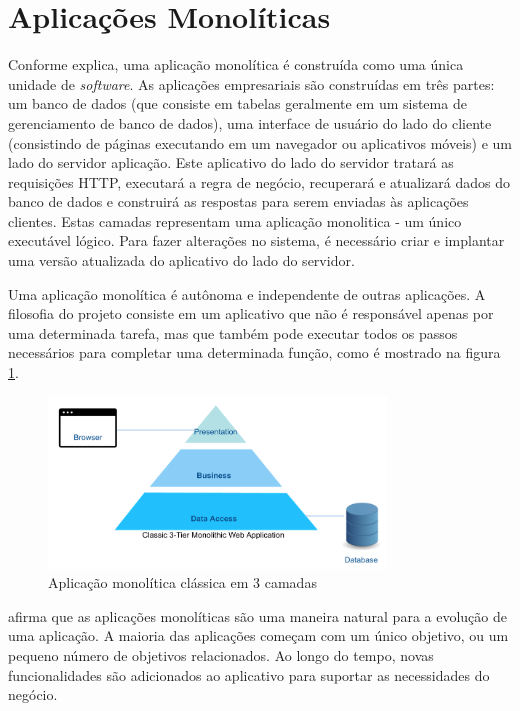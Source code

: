\section{Aplicações Monolíticas}\label{sec:monolitico}

Conforme  explica, uma aplicação monolítica é construída como uma única unidade de \textit{software}. As aplicações empresariais são construídas em três partes: um banco de dados (que consiste em tabelas geralmente em um sistema de gerenciamento de banco de dados), uma interface de usuário do lado do cliente (consistindo de páginas executando em um navegador ou aplicativos móveis) e um lado do servidor aplicação. Este aplicativo do lado do servidor tratará as requisições HTTP, executará a regra de negócio, recuperará e atualizará dados do banco de dados e construirá as respostas para serem enviadas às aplicações clientes. Estas camadas representam uma aplicação monolitica - um único executável lógico. Para fazer alterações no sistema, é necessário criar e implantar uma versão atualizada do aplicativo do lado do servidor.

Uma aplicação monolítica é autônoma e independente de outras aplicações. A filosofia do projeto consiste em um aplicativo que não é responsável apenas por uma determinada tarefa, mas que também pode executar todos os passos necessários para completar uma determinada função, como é mostrado na figura \ref{fig:three-tier}.

\begin{figure}[ht]
    \centering
    \includegraphics[width=0.8\textwidth]{figuras/three-tier.png}
    \caption{Aplicação monolítica clássica em 3 camadas}
    \label{fig:three-tier}
\end{figure}

 afirma que as aplicações monolíticas são uma maneira natural para a evolução de uma aplicação. A maioria das aplicações começam com um único objetivo, ou um pequeno número de objetivos relacionados. Ao longo do tempo, novas funcionalidades são adicionados ao aplicativo para suportar as necessidades do negócio. 

